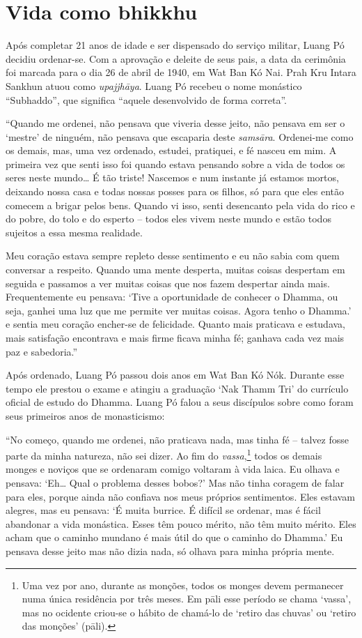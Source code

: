 \chapter{Vida como bhikkhu}

Após completar 21 anos de idade e ser dispensado do serviço militar,
Luang Pó decidiu ordenar-se. Com a aprovação e deleite de seus pais, a
data da cerimônia foi marcada para o dia 26 de abril de 1940, em Wat Ban
Kó Nai. Prah Kru Intara Sankhun atuou como \emph{upajjhāya}. Luang Pó
recebeu o nome monástico ``Subhaddo'', que significa ``aquele
desenvolvido de forma correta''.

``Quando me ordenei, não pensava que viveria desse jeito, não pensava em
ser o `mestre' de ninguém, não pensava que escaparia deste
\emph{samsāra}. Ordenei-me como os demais, mas, uma vez ordenado,
estudei, pratiquei, e fé nasceu em mim. A primeira vez que senti isso
foi quando estava pensando sobre a vida de todos os seres neste
mundo\ldots{} É tão triste! Nascemos e num instante já estamos mortos,
deixando nossa casa e todas nossas posses para os filhos, só para que
eles então comecem a brigar pelos bens. Quando vi isso, senti desencanto
pela vida do rico e do pobre, do tolo e do esperto -- todos eles vivem
neste mundo e estão todos sujeitos a essa mesma realidade.

Meu coração estava sempre repleto desse sentimento e eu não sabia com
quem conversar a respeito. Quando uma mente desperta, muitas coisas
despertam em seguida e passamos a ver muitas coisas que nos fazem
despertar ainda mais. Frequentemente eu pensava: `Tive a oportunidade de
conhecer o Dhamma, ou seja, ganhei uma luz que me permite ver muitas
coisas. Agora tenho o Dhamma.' e sentia meu coração encher-se de
felicidade. Quanto mais praticava e estudava, mais satisfação encontrava
e mais firme ficava minha fé; ganhava cada vez mais paz e sabedoria.''

Após ordenado, Luang Pó passou dois anos em Wat Ban Kó Nók. Durante esse
tempo ele prestou o exame e atingiu a graduação `Nak Thamm Tri' do
currículo oficial de estudo do Dhamma. Luang Pó falou a seus discípulos
sobre como foram seus primeiros anos de monasticismo:

``No começo, quando me ordenei, não praticava nada, mas tinha fé --
talvez fosse parte da minha natureza, não sei dizer. Ao fim do
\emph{vassa},\footnote{Uma vez por ano, durante as monções, todos os
  monges devem permanecer numa única residência por três meses. Em pāli
  esse período se chama `vassa', mas no ocidente criou-se o hábito de
  chamá-lo de `retiro das chuvas' ou `retiro das monções' (pāli).}
todos os demais monges e noviços que se ordenaram comigo voltaram à vida
laica. Eu olhava e pensava: `Eh\ldots{} Qual o problema desses bobos?'
Mas não tinha coragem de falar para eles, porque ainda não confiava nos
meus próprios sentimentos. Eles estavam alegres, mas eu pensava: `É
muita burrice. É difícil se ordenar, mas é fácil abandonar a vida
monástica. Esses têm pouco mérito, não têm muito mérito. Eles acham que
o caminho mundano é mais útil do que o caminho do Dhamma.' Eu pensava
desse jeito mas não dizia nada, só olhava para minha própria mente.


